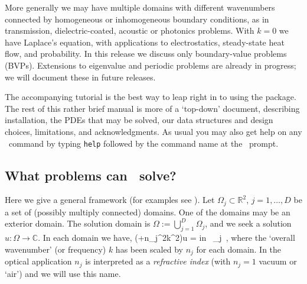 \documentclass[12pt]{article}
\begin{document}
More generally we may have multiple domains with different
wavenumbers connected by homogeneous or inhomogeneous boundary conditions,
as in transmission, dielectric-coated, acoustic or photonics problems.
With $k=0$ we have Laplace's equation, with applications to
electrostatics, steady-state heat flow, and probability.
In this release we discuss only boundary-value problems (BVPs).
Extensions to eigenvalue and periodic problems are already in progress;
we will document these in future releases.

The accompanying tutorial is the best way to leap right in to using
the package.
The rest of this rather brief manual is more of a `top-down' document,
describing installation, the PDEs that may be solved,
our data structures and design choices, limitations, and acknowledgments.
As usual you
may also get help on any \mpspack\ command by typing {\tt help} followed
by the command name at the \matlab\ prompt.

\subsection{What problems can \mpspack\ solve?}
\label{s:bvp}

Here we give a
general framework (for examples see \cite{mfs,polygonscatt}). 
Let $\Omega_j \subset \mathbb{R}^2$, $j=1,\ldots,D$ be a set of
(possibly multiply connected) domains. One of the domains may
be an exterior domain.
The solution domain is $\Omega:=\bigcup_{j=1}^D \Omega_j$,
and we seek a solution $u:\Omega \to\mathbb{C}$.
In each domain we have,
\be
(\Delta+n_j^2k^2)u\; = \qquad \mbox{in } \Omega_j~,
\label{e:helmj}
\ee
where the `overall wavenumber' (or frequency) $k$ has been scaled by
$n_j$ for each domain. In the optical application $n_j$ is interpreted
as a {\em refractive index} (with $n_j=1$ vacuum or `air') and we
will use this name.
\end{document}
